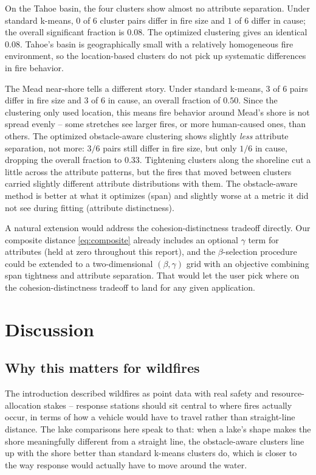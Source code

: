 \documentclass[11pt]{article}
\begin{document}
On the Tahoe basin, the four clusters show almost no attribute separation. Under standard k-means, $0$ of $6$ cluster pairs differ in fire size and $1$ of $6$ differ in cause; the overall significant fraction is $0.08$. The optimized clustering gives an identical $0.08$. Tahoe's basin is geographically small with a relatively homogeneous fire environment, so the location-based clusters do not pick up systematic differences in fire behavior. 
 
The Mead near-shore tells a different story. Under standard k-means, $3$ of $6$ pairs differ in fire size and $3$ of $6$ in cause, an overall fraction of $0.50$. Since the clustering only used location, this means fire behavior around Mead's shore is not spread evenly -- some stretches see larger fires, or more human-caused ones, than others. The optimized obstacle-aware clustering shows slightly \emph{less} attribute separation, not more: $3/6$ pairs still differ in fire size, but only $1/6$ in cause, dropping the overall fraction to $0.33$. Tightening clusters along the shoreline cut a little across the attribute patterns, but the fires that moved between clusters carried slightly different attribute distributions with them. The obstacle-aware method is better at what it optimizes (span) and slightly worse at a metric it did not see during fitting (attribute distinctness). 
 
A natural extension would address the cohesion-distinctness tradeoff directly.  Our composite distance \eqref{eq:composite} already includes an optional $\gamma$ term for attributes (held at zero throughout this report), and the $\beta$-selection procedure could be extended to a two-dimensional $(\beta, \gamma)$ grid with an objective combining span tightness and attribute separation. That would let the user pick where on the cohesion-distinctness tradeoff to land for any given application.

\section{Discussion}
\label{sec:discussion}

\subsection{Why this matters for wildfires}

The introduction described wildfires as point data with real safety and resource-allocation stakes -- response stations should sit central to where fires actually occur, in terms of how a vehicle would have to travel rather than straight-line distance. The lake comparisons here speak to that: when a lake's shape makes the shore meaningfully different from a straight line, the obstacle-aware clusters line up with the shore better than standard k-means clusters do, which is closer to the way response would actually have to move around the water.
\end{document}
